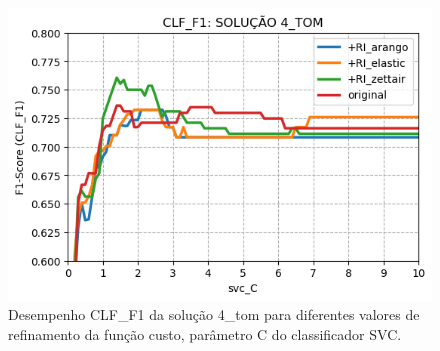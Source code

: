 \begin{figure}[h]
    \centering
    \caption{Desempenho CLF\_F1 da solução 4\_tom para diferentes valores de refinamento da função custo, parâmetro C do classificador SVC.}
    \vspace{-0.0cm}
    \begin{center}
        \includegraphics[width=1.0\textwidth]{img/clf-f1-4-tom.png}
    \end{center}
    \vspace{-0.0cm}
    \label{fig:clf-f1-4-tom}
\end{figure}
